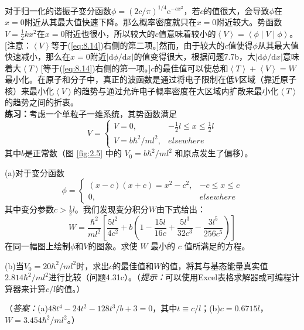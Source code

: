 \begin{examplebox}
        对于归一化的谐振子变分函数$\phi = \left(2c/\pi\right)^{1/4} \mathrm{e}^{-cx^2}$，若$c$的值很大，会导致$\phi$在$x=0$附近从其最大值快速下降。那么概率密度就只在$x=0$附近较大。势函数$V = \frac{1}{2}kx^2$在$x=0$附近也很小，所以较大的$c$值意味着较小的$\left\langle V \right\rangle = \left\langle \phi \middle| V \middle| \phi \right\rangle$。[注意：$\left\langle V \right\rangle$等于(\ref{eq:8.14})右侧的第二项。]然而，由于较大的$c$值使得$\phi$从其最大值快速减小，那么在$x=0$附近$\left|\mathrm{d}\phi/\mathrm{d}x\right|$的值变得很大，根据问题7.7b，大$\left|\mathrm{d}\phi/\mathrm{d}x\right|$意味着大$\left\langle T \right\rangle$[等于(\ref{eq:8.14})右侧的第一项。]$c$的最佳值可以使总和$\left\langle T \right\rangle + \left\langle V \right\rangle = W$最小化。在原子和分子中，真正的波函数是通过将电子限制在低$V$区域（靠近原子核）来最小化$\left\langle V \right\rangle$的趋势与通过允许电子概率密度在大区域内扩散来最小化$\left\langle T \right\rangle$的趋势之间的折衷。
        \\

        \textbf{练习：}考虑一个单粒子一维系统，其势函数满足
        \begin{equation*}
            V = \begin{cases}
                V = 0, & -\frac{1}{2}l \leq x \leq \frac{1}{2}l \\
                V = b\hbar^2/ml^2, & elsewhere
            \end{cases}
        \end{equation*}
        其中$b$是正常数（图 \ref{fig:2.5} 中的 $V_0 = b\hbar^2/ml^2$ 和原点发生了偏移）。

        (a)对于变分函数
        \begin{equation*}
            \phi = \begin{cases}
                \left(x-c\right)\left(x+c\right) = x^2 - c^2, & -c \leq x \leq c \\
                0, & elsewhere
            \end{cases}
        \end{equation*}
        其中变分参数$c > \frac{1}{2}l$。我们发现变分积分$W$由下式给出：
        \begin{equation*}
            W = \frac{\hbar^2}{ml^2}\left[\frac{5l^2}{4c^2} + b\left(1-\frac{15l}{16c} + \frac{5l^3}{32c^3} - \frac{3l^5}{256c^5}\right)\right]
        \end{equation*}
        在同一幅图上绘制$\phi$和$V$的图象。求使 $W$ 最小的 $c$ 值所满足的方程。

        (b)当$V_0 = 20\hbar^2/ml^2$时，求出$c$的最佳值和$W$的值，将其与基态能量真实值$2.814\hbar^2/ml^2$进行比较（问题4.31c）。（\textit{提示：}可以使用Excel表格求解器或可编程计算器来计算$c/l$的值。）

        （\textit{答案：}(a)$48t^4-24t^2-128t^3/b+3=0$，其中$t \equiv c/l$；(b)$c = 0.6715l$，$W = 3.454\hbar^2/ml^2$。）
    \end{examplebox}

